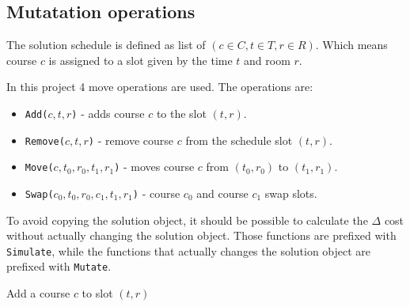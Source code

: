 \subsection{Mutatation operations}
\label{sec:mutate-operations}

The solution schedule is defined as list of $(c \in C, t \in T, r \in R)$. Which means course $c$ is assigned to a slot given by the time $t$ and room $r$.

In this project 4 move operations are used. The operations are:
\begin{itemize}
\item \texttt{Add($c, t, r$)} - adds course $c$ to the slot $(t, r)$.  
\item \texttt{Remove($c, t, r$)} - remove course $c$ from the schedule slot $(t, r)$.
\item \texttt{Move($c, t_0, r_0, t_1, r_1$)} - moves course $c$ from $(t_0, r_0)$ to $(t_1, r_1)$.
\item \texttt{Swap($c_0, t_0, r_0, c_1, t_1, r_1$)} - course $c_0$ and course $c_1$ swap slots.
\end{itemize}

To avoid copying the solution object, it should be possible to calculate the $\Delta$ cost without actually changing the solution object. Those functions are prefixed with \texttt{Simulate}, while the functions that actually changes the solution object are prefixed with \texttt{Mutate}.

\begin{algorithm}[H]
  \caption{Add a course $c$ to slot $(t, r)$}
  \begin{algorithmic}[1]
       
          \State {}
      \EndIf
      \State {} 
    \EndFunction
    
    \Statex
             
        \EndIf
    \EndFunction
  \end{algorithmic}
\end{algorithm}


